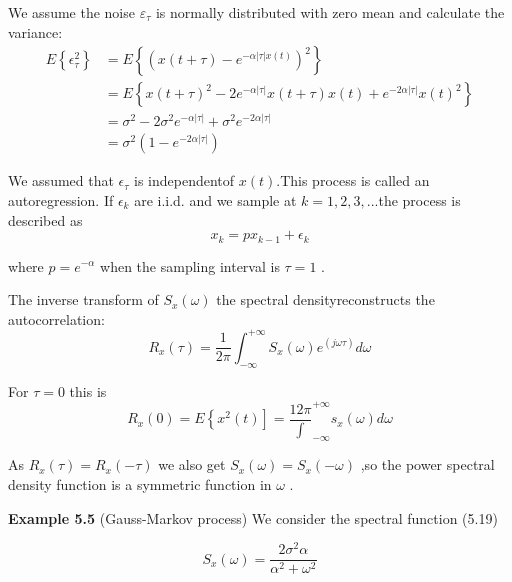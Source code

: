 	      	We assume the noise  $ \varepsilon_{\tau} $ is normally distributed with zero mean and calculate the variance:
	      	\begin{equation}\label{5.20}
	      	\begin{aligned}
	      E\left\lbrace\epsilon_{\tau}^{2} \right\rbrace &=E\left\lbrace(x(t+\tau)-e^{-\alpha|\tau|x(t)})^{2} \right\rbrace\\
	      &=E\left\lbrace x(t+\tau)^{2}-2e^{-\alpha|\tau|}x(t+\tau)x(t)+e^{-2\alpha|\tau|}x(t)^{2}\right\rbrace \\
	      &=\sigma^{2}-2\sigma^{2}e^{-\alpha|\tau|} +\sigma^{2}e^{-2\alpha|\tau|}\\
	      &=\sigma^{2}(1-e^{-2\alpha|\tau|}) 
	      	\end{aligned}
	      	\end{equation}
	      	 
	     
	       We assumed that $ \epsilon_{\tau} $ is independentof $ x(t) $.This process is called an autoregression.
	       If $ \epsilon_{k}  $ are i.i.d. and we sample at $k = 1, 2, 3,...$the process is described as 
	       \begin{equation}\label{5.21}
	        x_{k}=px_{k-1} +\epsilon_{k}
	       \end{equation}
	       
	       
	       where $ p=e^{-\alpha} $ when the sampling interval is $ \tau=1 $ .
	       
	       The inverse transform of $ S_{x}(\omega) $ the spectral densityreconstructs the autocorrelation:
	      	\begin{equation}\label{5.22}
	      	R_{x}(\tau)=\frac{1}{2\pi}\int_{-\infty}^{+\infty}S_{x}(\omega)e^(j\omega\tau)d\omega
	      	\end{equation}
	       
	      	
	      	For $ \tau=0 $ this is
	      	\begin{equation}\label{5.23}
	      	 R_{x}(0)=E\left\lbrace x^{2}(t) \right] =\frac{{1}{2\pi}}\int_{-\infty}^{+\infty} s_{x}(\omega)d\omega
	      	\end{equation}
	       
	      	
	      	As $ R_{x}(\tau)=R_{x}(-\tau) $ we also get $ S_{x}(\omega)=S_{x}(-\omega) $ ,so the power spectral density function is a symmetric function in $ \omega $ . 
	      	
	      	\textbf{Example 5.5} (Gauss-Markov process) We consider the spectral function (5.19)
	      	
	      	\[ S_{x}(\omega)=\frac{2\sigma^{2}\alpha}{\alpha^{2}+\omega^{2}} \]
	      	
